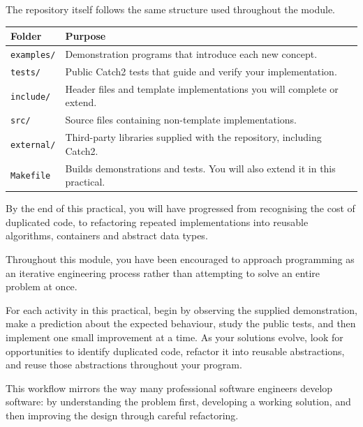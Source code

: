 \documentclass{csc2059practical}
\begin{document}
The repository itself follows the same structure used throughout the module.

\begin{center}
\begin{tabular}{ll}
\textbf{Folder} & \textbf{Purpose}\\
\hline
\texttt{examples/} & Demonstration programs that introduce each new concept.\\
\texttt{tests/} & Public Catch2 tests that guide and verify your implementation.\\
\texttt{include/} & Header files and template implementations you will complete or extend.\\
\texttt{src/} & Source files containing non-template implementations.\\
\texttt{external/} & Third-party libraries supplied with the repository, including Catch2.\\
\texttt{Makefile} & Builds demonstrations and tests. You will also extend it in this practical.\\
\end{tabular}
\end{center}

By the end of this practical, you will have progressed from recognising the
cost of duplicated code, to refactoring repeated implementations into reusable
algorithms, containers and abstract data types.



Throughout this module, you have been encouraged to approach programming as an
iterative engineering process rather than attempting to solve an entire problem
at once.

For each activity in this practical, begin by observing the supplied
demonstration, make a prediction about the expected behaviour, study the public
tests, and then implement one small improvement at a time. As your solutions
evolve, look for opportunities to identify duplicated code, refactor it into
reusable abstractions, and reuse those abstractions throughout your program.

This workflow mirrors the way many professional software engineers develop
software: by understanding the problem first, developing a working solution, and
then improving the design through careful refactoring.
\end{document}
